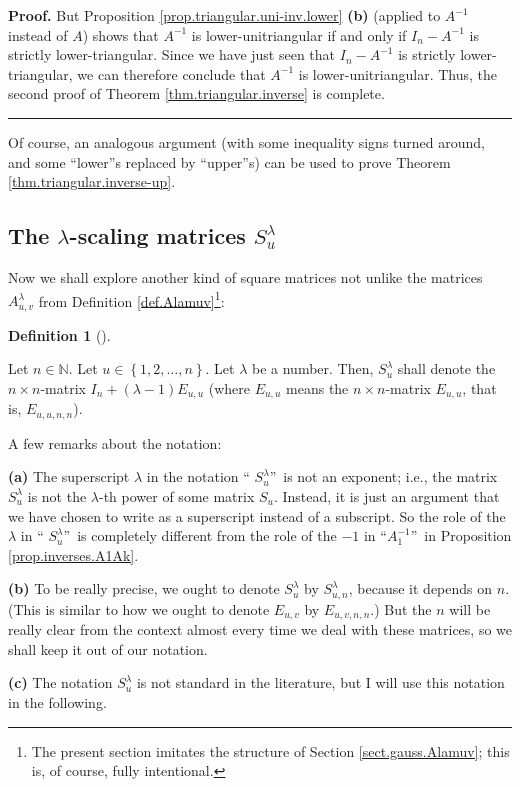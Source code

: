 \documentclass[numbers=enddot,12pt,final,onecolumn,notitlepage]{scrartcl}%
\theoremstyle{definition}
\newtheorem{defi}[theo]{Definition}
\newenvironment{definition}[1][]
{\begin{defi}[#1]\begin{leftbar}}
{\end{leftbar}\end{defi}}
\newenvironment{proof}[1][Proof]{\noindent\textbf{#1.} }{\ \rule{0.5em}{0.5em}}
\begin{document}
\begin{proof}
But Proposition \ref{prop.triangular.uni-inv.lower} \textbf{(b)} (applied to
$A^{-1}$ instead of $A$) shows that $A^{-1}$ is lower-unitriangular if and
only if $I_{n}-A^{-1}$ is strictly lower-triangular. Since we have just seen
that $I_{n}-A^{-1}$ is strictly lower-triangular, we can therefore conclude
that $A^{-1}$ is lower-unitriangular. Thus, the second proof of Theorem
\ref{thm.triangular.inverse} is complete.
\end{proof}

Of course, an analogous argument (with some inequality signs turned around,
and some \textquotedblleft lower\textquotedblright s replaced by
\textquotedblleft upper\textquotedblright s) can be used to prove Theorem
\ref{thm.triangular.inverse-up}.

\subsection{The $\lambda$-scaling matrices $S_{u}^{\lambda}$}

Now we shall explore another kind of square matrices not unlike the matrices
$A_{u,v}^{\lambda}$ from Definition \ref{def.Alamuv}\footnote{The present
section imitates the structure of Section \ref{sect.gauss.Alamuv}; this is, of
course, fully intentional.}:

\begin{definition}
\label{def.Slamu}Let $n\in\mathbb{N}$. Let $u\in\left\{  1,2,\ldots,n\right\}
$. Let $\lambda$ be a number. Then, $S_{u}^{\lambda}$ shall denote the
$n\times n$-matrix $I_{n}+\left(  \lambda-1\right)  E_{u,u}$ (where $E_{u,u}$
means the $n\times n$-matrix $E_{u,u}$, that is, $E_{u,u,n,n}$).

A few remarks about the notation:

\textbf{(a)} The superscript $\lambda$ in the notation \textquotedblleft%
$S_{u}^{\lambda}$\textquotedblright\ is not an exponent; i.e., the matrix
$S_{u}^{\lambda}$ is not the $\lambda$-th power of some matrix $S_{u}$.
Instead, it is just an argument that we have chosen to write as a superscript
instead of a subscript. So the role of the $\lambda$ in \textquotedblleft%
$S_{u}^{\lambda}$\textquotedblright\ is completely different from the role of
the $-1$ in \textquotedblleft$A_{1}^{-1}$\textquotedblright\ in Proposition
\ref{prop.inverses.A1Ak}.

\textbf{(b)} To be really precise, we ought to denote $S_{u}^{\lambda}$ by
$S_{u,n}^{\lambda}$, because it depends on $n$. (This is similar to how we
ought to denote $E_{u,v}$ by $E_{u,v,n,n}$.) But the $n$ will be really clear
from the context almost every time we deal with these matrices, so we shall
keep it out of our notation.

\textbf{(c)} The notation $S_{u}^{\lambda}$ is not standard in the literature,
but I will use this notation in the following.
\end{definition}
\end{document}
